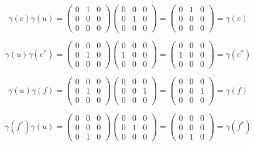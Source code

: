 \begin{solution}
    $$\gamma(e)\gamma(u)=\left(\begin{array}{ccc} 0 & 1 & 0 \\ 0 & 0 & 0 \\ 0 & 0 & 0 \end{array}\right)
    \left(\begin{array}{ccc} 0 & 0 & 0 \\ 0 & 1 & 0 \\ 0 & 0 & 0 \end{array}\right)
    =\left(\begin{array}{ccc} 0 & 1 & 0 \\ 0 & 0 & 0 \\ 0 & 0 & 0 \end{array}\right)=\gamma(e)$$

    $$\gamma(u)\gamma(e^*)=\left(\begin{array}{ccc} 0 & 0 & 0 \\ 0 & 1 & 0 \\ 0 & 0 & 0 \end{array}\right)
    \left(\begin{array}{ccc} 0 & 0 & 0 \\ 1 & 0 & 0 \\ 0 & 0 & 0 \end{array}\right)
    =\left(\begin{array}{ccc} 0 & 0 & 0 \\ 1 & 0 & 0 \\ 0 & 0 & 0 \end{array}\right)=\gamma(e^*)$$

    $$\gamma(u)\gamma(f)=\left(\begin{array}{ccc} 0 & 0 & 0 \\ 0 & 1 & 0 \\ 0 & 0 & 0 \end{array}\right)
    \left(\begin{array}{ccc} 0 & 0 & 0 \\ 0 & 0 & 1 \\ 0 & 0 & 0 \end{array}\right)
    =\left(\begin{array}{ccc} 0 & 0 & 0 \\ 0 & 0 & 1 \\ 0 & 0 & 0 \end{array}\right)=\gamma(f)$$

    $$\gamma(f^*)\gamma(u)=\left(\begin{array}{ccc} 0 & 0 & 0 \\ 0 & 0 & 0 \\ 0 & 1 & 0 \end{array}\right)
    \left(\begin{array}{ccc} 0 & 0 & 0 \\ 0 & 1 & 0 \\ 0 & 0 & 0 \end{array}\right)
    =\left(\begin{array}{ccc} 0 & 0 & 0 \\ 0 & 0 & 0 \\ 0 & 1 & 0 \end{array}\right)=\gamma(f^*)$$


\end{solution}
